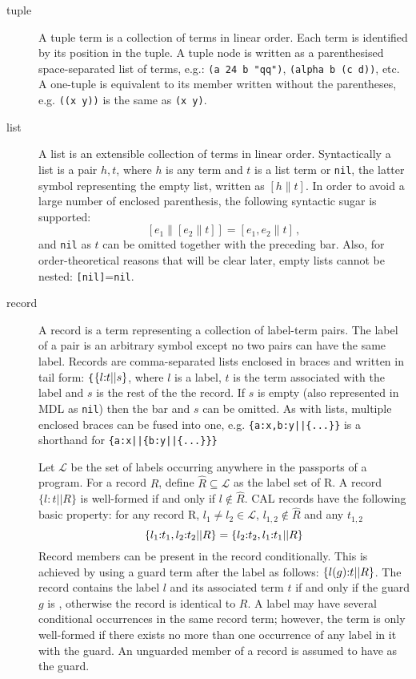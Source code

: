 \documentclass[11pt]{report}
\begin{document}
\begin{description}
\item[tuple] A tuple term is a collection of terms in linear order. Each term is identified by its position in the tuple.  A tuple node is written as a parenthesised space-separated list of terms, e.g.: \verb$(a 24 b "qq")$, \verb$(alpha b (c d))$, etc. A one-tuple is equivalent to its member written without the parentheses, e.g. \verb"((x y))" is the same as \verb"(x y)".

\item[list] A list is an extensible collection of terms in linear order. Syntactically a list is a pair $h,t$, where $h$ is any term
and $t$ is a list term or \verb$nil$, the latter symbol representing the empty list, written as $[h\| t]$. In order to avoid a large number of enclosed parenthesis, the following syntactic sugar is supported:
\[
[e_1\| [e_2 \| t]] = [e_1,e_2\| t]\,,
\]
and \verb$nil$ as $t$ can be omitted together with the preceding bar. Also, for order-theoretical reasons that will be clear later, empty lists cannot be nested: \verb$[nil]$=\verb$nil$.

\item[record] A record is a term representing
a collection of label-term pairs. The label of a pair is an arbitrary symbol except no
two pairs can have the same label. Records are comma-separated lists enclosed in braces and written
in tail form: \verb${$$\{l\hbox{:}t || s\}$, where $l$ is a label,
$t$ is the term associated with the label and $s$ is the rest of the the record.
If $s$ is empty (also represented in MDL as  \verb$nil$) then the bar and $s$ can be omitted. As with lists, multiple enclosed braces can be fused into one, e.g.  \verb"{a:x,b:y||{...}}" is a shorthand for \verb"{a:x||{b:y||{...}}}"

Let $\mathcal L$ be the set of labels occurring anywhere in the passports of a program.
For a record $R$, define  $\hat{R}\subseteq {\mathcal L}$ as the label set of R. A record $\{l:t || R\}$
is well-formed if and only if  $l\not\in\hat{R}$.
CAL records have the following basic property: for any record R,
$l_1\ne l_2\in {\mathcal L}$, $l_{1,2}\not\in\hat{R}$
and any $t_{1,2}$
\[
\{l_1\hbox{:}t_1,l_2\hbox{:}t_2|| R\}=\{l_2\hbox{:}t_2,l_1\hbox{:}t_1|| R\}
\]
Record members can be present in the record conditionally. This is achieved by using a guard
term after the label as follows: $\{l(g)\hbox{:}t||R\}$. The record contains the label $l$ and its
associated term $t$ if and only if the guard $g$ is \true, otherwise the record
is identical to $R$. A label may have several conditional occurrences in the same record term; however, the term is only well-formed if there exists no more than one occurrence of any label in it with the \true{} guard.  An unguarded member of a record is assumed to have \true{} as the guard.


\end{description}
\end{document}
